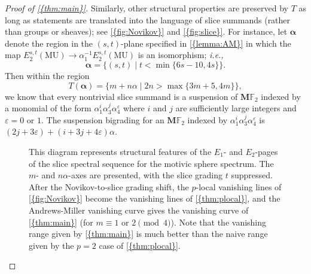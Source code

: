 \documentclass[10pt]{amsart}
\numberwithin{equation}{section}
\theoremstyle{plain}
\theoremstyle{definition}
\theoremstyle{remark}
\begin{document}
\begin{proof}[Proof of {\autoref{{thm:main}}}]
Similarly, other structural properties are preserved by $T$ as long as statements are translated into the language of slice summands (rather than groups or sheaves); see {\autoref{{fig:Novikov}}} and {\autoref{{fig:slice}}}.  For instance, let $\boldsymbol{\alpha}$ denote the region in the $(s,t)$-plane specified in {\autoref{{lemma:AM}}} in which the map $E_2^{s,t}({\mathrm{MU}})\to \alpha_1^{-1}E_2^{s,t}({\mathrm{MU}})$ is an isomorphism; \emph{i.e.,}
\[
  \boldsymbol{\alpha} = \{(s,t)\mid t<\min\{6s-10,4s\}\}.
\]
Then within the region
\[
  T(\boldsymbol{\alpha}) = \{m+n\alpha\mid 2n>\max\{3m+5,4m\}\},
\]
we know that every nontrivial slice summand is a suspension of ${\mathbf{M}} {\mathbb{F}}_2$ indexed by a monomial of the form $\alpha_1^i\alpha_3^j\alpha_4^\varepsilon$ where $i$ and $j$ are sufficiently large integers and $\varepsilon = 0$ or $1$.  The suspension bigrading for an ${\mathbf{M}} {\mathbb{F}}_2$ indexed by $\alpha_1^i\alpha_3^j\alpha_4^\varepsilon$ is $(2j+3\varepsilon) + (i+3j+4\varepsilon)\alpha$.

\begin{figure}
\begin{center}
\end{center}
\caption{This diagram represents structural features of the $E_1$- and $E_2$-pages of the slice spectral sequence for the motivic sphere spectrum.  The $m$- and $n\alpha$-axes are presented, with the slice grading $t$ suppressed.  After the Novikov-to-slice grading shift, the $p$-local vanishing lines of {\autoref{{fig:Novikov}}} become the vanishing lines of {\autoref{{thm:plocal}}}, and the Andrews-Miller vanishing curve gives the vanishing curve of {\autoref{{thm:main}}} (for $m\equiv 1\text{ or }2\pmod{4}$).  Note that the vanishing range given by {\autoref{{thm:main}}} is much better than the naive range given by the $p=2$ case of {\autoref{{thm:plocal}}}.}\label{fig:slice}
\end{figure}


\end{proof}
\end{document}
